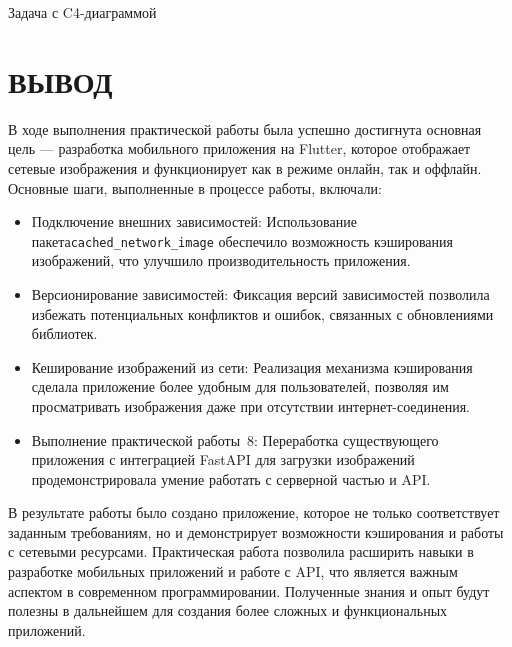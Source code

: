 \begin{image}
	\caption{Задача с C4-диаграммой}
	\label{fig:task:4}
\end{image}

\clearpage

\section*{ВЫВОД}

В ходе выполнения практической работы
была успешно достигнута основная цель --- разработка мобильного приложения
на Flutter, которое отображает сетевые изображения
и функционирует как в режиме онлайн, так и оффлайн.
Основные шаги, выполненные в процессе работы, включали:

\begin{itemize}
	\item Подключение внешних зависимостей:
		Использование пакета\texttt{cached\_network\_image} 
		обеспечило возможность кэширования изображений,
		что улучшило производительность приложения.
	\item Версионирование зависимостей:
		Фиксация версий зависимостей позволила избежать
		потенциальных конфликтов и ошибок, связанных с обновлениями библиотек.
	\item Кеширование изображений из сети:
		Реализация механизма кэширования сделала приложение более удобным
		для пользователей, позволяя им просматривать изображения даже
		при отсутствии интернет-соединения.
	\item Выполнение практической работы \No\,8:
		Переработка существующего приложения с интеграцией FastAPI
		для загрузки изображений продемонстрировала умение работать
		с серверной частью и API.
\end{itemize}

В результате работы было создано приложение,
которое не только соответствует заданным требованиям,
но и демонстрирует возможности кэширования и работы с сетевыми ресурсами.
Практическая работа позволила расширить навыки
в разработке мобильных приложений и работе с API,
что является важным аспектом в современном программировании.
Полученные знания и опыт будут полезны в дальнейшем
для создания более сложных и функциональных приложений.

